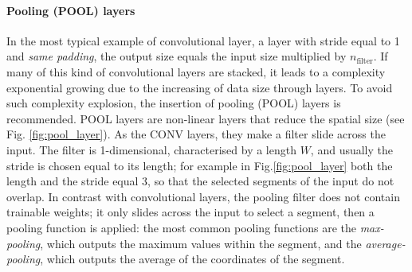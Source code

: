\paragraph*{Pooling (POOL) layers} 
In the most typical example of convolutional layer, \ie a layer with stride equal to 1 and \emph{same padding}, the output size equals the input size multiplied by $n_{\text{filter}}$. If many of this kind of convolutional layers are stacked, it leads to a complexity exponential growing due to the increasing of data size through layers. To avoid such complexity explosion, the insertion of pooling (POOL) layers is recommended.  POOL layers 
are non-linear layers that reduce the spatial size (see Fig. \ref{fig:pool_layer}). As the CONV layers, they make a filter slide across the input. The filter is 1-dimensional, characterised by a length $W$, and usually the stride is chosen equal to its length; for example in Fig.\ref{fig:pool_layer} both the length and the stride equal 3, so that the selected segments of the input do not overlap. In contrast with convolutional layers, the pooling filter does not contain trainable weights; it only slides across the input to select a segment, then a pooling function is applied: the most common pooling functions are the \emph{max-pooling}, which outputs the maximum values within the segment, and the \emph{average-pooling}, which outputs the average of the coordinates of the segment. 


%

